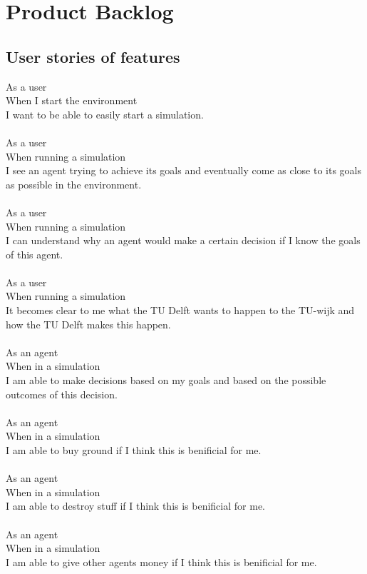\section{Product Backlog}
\subsection{User stories of features}
As a user\\
When I start the environment\\
I want to be able to easily start a simulation.\\
\\
As a user\\
When running a simulation\\
I see an agent trying to achieve its goals and eventually come as close to its goals as possible in the environment.\\
\\
As a user\\
When running a simulation\\
I can understand why an agent would make a certain decision if I know the goals of this agent.\\
\\
As a user\\
When running a simulation\\
It becomes clear to me what the TU Delft wants to happen to the TU-wijk and how the TU Delft makes this happen.\\
\\
As an agent\\
When in a simulation\\
I am able to make decisions based on my goals and based on the possible outcomes of this decision.\\
\\
As an agent\\
When in a simulation\\
I am able to buy ground if I think this is benificial for me.\\
\\
As an agent\\
When in a simulation\\
I am able to destroy stuff if I think this is benificial for me.\\
\\
As an agent\\
When in a simulation\\
I am able to give other agents money if I think this is benificial for me.\\
